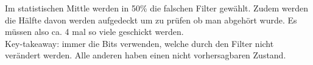 \documentclass[12pt]{scrartcl}
\begin{document}
Im statistischen Mittle werden in 50\% die falschen Filter gewählt. Zudem werden
die Hälfte davon werden aufgedeckt um zu prüfen ob man abgehört wurde. Es müssen
also ca. 4 mal so viele geschickt werden. \\


Key-takeaway: immer die Bits verwenden, welche durch den Filter nicht verändert werden. Alle
anderen haben einen nicht vorhersagbaren Zustand.



















\end{document}
